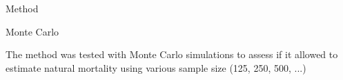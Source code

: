 \documentclass[final]{beamer}
\begin{document}
\begin{frame}{}
\begin{columns}[t]
\begin{column}{.47\linewidth}
\begin{block}{Method}
        
      \end{block}

      \begin{block}{Monte Carlo}

        The method was tested with Monte Carlo simulations to assess if it allowed to estimate natural mortality using various sample size (125, 250, 500, ...)
        

\end{block}
\end{column}
\end{columns}
\end{frame}
\end{document}
